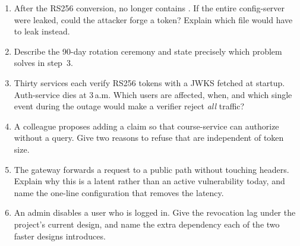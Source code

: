 \begin{quiz}
\begin{enumerate}
  \item After the RS256 conversion,  no longer
  contains . If the entire config-server were
  leaked, could the attacker forge a token? Explain which file would
  have to leak instead.
  \item Describe the 90-day rotation ceremony and state precisely which
  problem  solves in step~3.
  \item Thirty services each verify RS256 tokens with a JWKS fetched at
  startup. Auth-service dies at 3\,a.m. Which users are affected, when,
  and which single event during the outage would make a verifier reject
  \emph{all} traffic?
  \item A colleague proposes adding a  claim so that
  course-service can authorize without a query. Give two reasons to
  refuse that are independent of token size.
  \item The gateway forwards a request to a public path without touching
  headers. Explain why this is a latent rather than an active
  vulnerability today, and name the one-line configuration that removes
  the latency.
  \item An admin disables a user who is logged in. Give the revocation
  lag under the project's current design, and name the extra dependency
  each of the two faster designs introduces.
\end{enumerate}
\end{quiz}
